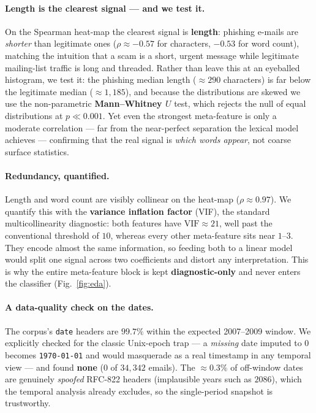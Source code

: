\documentclass[11pt]{article}
\begin{document}
\paragraph{Length is the clearest signal --- and we test it.} On the Spearman heat-map the
clearest signal is \textbf{length}: phishing e-mails are \emph{shorter} than legitimate
ones ($\rho \approx -0.57$ for characters, $-0.53$ for word count), matching the intuition
that a scam is a short, urgent message while legitimate mailing-list traffic is long and
threaded. Rather than leave this at an eyeballed histogram, we test it: the phishing median
length ($\approx 290$ characters) is far below the legitimate median ($\approx 1{,}185$),
and because the distributions are skewed we use the non-parametric \textbf{Mann--Whitney
$U$} test, which rejects the null of equal distributions at $p \ll 0.001$. Yet even the
strongest meta-feature is only a moderate correlation --- far from the near-perfect
separation the lexical model achieves --- confirming that the real signal is \emph{which
words appear}, not coarse surface statistics.

\paragraph{Redundancy, quantified.} Length and word count are visibly collinear on the
heat-map ($\rho\approx0.97$). We quantify this with the \textbf{variance inflation factor}
(VIF), the standard multicollinearity diagnostic: both features have $\mathrm{VIF}\approx
21$, well past the conventional threshold of $10$, whereas every other meta-feature sits
near $1$--$3$. They encode almost the same information, so feeding both to a linear model
would split one signal across two coefficients and distort any interpretation. This is why
the entire meta-feature block is kept \textbf{diagnostic-only} and never enters the
classifier (Fig.~\ref{fig:eda}).

\paragraph{A data-quality check on the dates.} The corpus's \texttt{date} headers are
$99.7\%$ within the expected 2007--2009 window. We explicitly checked for the classic
Unix-epoch trap --- a \emph{missing} date imputed to $0$ becomes \texttt{1970-01-01} and
would masquerade as a real timestamp in any temporal view --- and found \textbf{none} (0 of
$34{,}342$ emails). The $\approx0.3\%$ of off-window dates are genuinely \emph{spoofed}
RFC-822 headers (implausible years such as $2086$), which the temporal analysis already
excludes, so the single-period snapshot is trustworthy.
\end{document}
